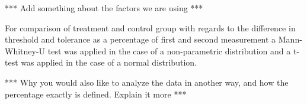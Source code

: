 *** Add something about the factors we are using ***
 
For comparison of treatment and control group with regards to the difference in threshold and tolerance as a percentage of first and second measurement a Mann-Whitney-U test was applied in the case of a non-parametric distribution and a t-test was applied in the case of a normal distribution. 

*** Why you would also like to analyze the data in another way, and how the percentage exactly is defined.  Explain it more ***


